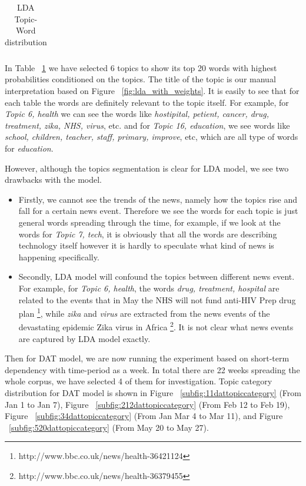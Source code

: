 \begin{table}[h!]
\begin{tabular}{|c c|}
 \end{tabular}
\caption{LDA Topic-Word distribution}
\label{table:ldatopicdistribution}
\end{table}

In Table ~\ref{table:ldatopicdistribution} we have selected 6 topics to show its top 20 words with highest probabilities conditioned on the topics. The title of the topic is our manual interpretation based on Figure ~\ref{fig:lda_with_weights}. It is easily to see that for each table the words are definitely relevant to the topic itself. For example, for \textit{Topic 6, health} we can see the words like \textit{hostipital, petient, cancer, drug, treatment, zika, NHS, virus}, etc. and for \textit{Topic 16, education}, we see words like \textit{school, children, teacher, staff, primary, improve}, etc, which are all type of words for \textit{education}. 

However, although the topics segmentation is clear for LDA model, we see two drawbacks with the model.
\begin{itemize}
    \item Firstly, we cannot see the trends of the news, namely how the topics rise and fall for a certain news event. Therefore we see the words for each topic is just general words spreading through the time, for example, if we look at the words for \textit{Topic 7, tech}, it is obviously that all the words are describing technology itself however it is hardly to speculate what kind of news is happening specifically.
    \item Secondly, LDA model will confound the topics between different news event. For example, for \textit{Topic 6, health}, the words \textit{drug, treatment, hospital} are related to the events that in May the NHS will not fund anti-HIV Prep drug plan \footnote{http://www.bbc.co.uk/news/health-36421124}, while \textit{zika} and \textit{virus} are extracted from the news events of the devastating epidemic Zika virus in Africa \footnote{http://www.bbc.co.uk/news/health-36379455}. It is not clear what news events are captured by LDA model exactly. 
\end{itemize}

Then for DAT model, we are now running the experiment based on short-term dependency with time-period as a week. In total there are 22 weeks spreading the whole corpus, we have selected 4 of them for investigation.
Topic category distribution for DAT model is shown in Figure ~\ref{subfig:11dattopiccategory} (From Jan 1 to Jan 7), Figure ~\ref{subfig:212dattopiccategory} (From Feb 12 to Feb 19), Figure ~\ref{subfig:34dattopiccategory} (From Jan Mar 4 to Mar 11), and Figure ~\ref{subfig:520dattopiccategory} (From May 20 to May 27).

